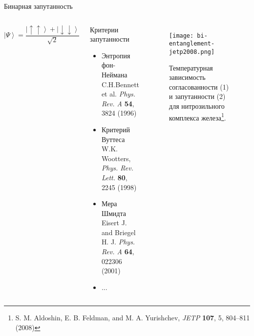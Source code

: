 \begin{frame}{Бинарная запутанность}
  \begin{columns}
    $$
      \left| \Psi \right\rangle
      = \frac{
        \left| \uparrow\uparrow \right\rangle +
        \left| \downarrow\downarrow \right\rangle
      }{\sqrt{2}}
    $$
    \begin{block}{Критерии запутанности}
      \begin{itemize}
        \item Энтропия фон-Неймана \\
          {\footnotesize C.H.Bennett et al. \textit{Phys. Rev. A} \textbf{54}, 3824 (1996)}
        \item Критерий Вуттеса \\
          {\footnotesize W.K. Wootters, \textit{Phys. Rev. Lett.} \textbf{80}, 2245 (1998)}
        \item Мера Шмидта \\
          {\footnotesize Eisert J. and Briegel H. J. \textit{Phys. Rev. A} \textbf{64}, 022306 (2001)}
        \item ...
      \end{itemize}
    \end{block}


    \begin{figure}
      \texttt{[image: bi-entanglement-jetp2008.png]}
      \captionsetup{skip=-2mm}
      \caption{Температурная зависимость согласованности (1) и запутанности (2) для нитрозильного комплекса железа\footnote[frame]{S. M. Aldoshin, E. B. Feldman, and M. A. Yurishchev, \textit{JETP} \textbf{107}, 5, 804–811 (2008)}.}
    \end{figure}
  \end{columns}
\end{frame}
